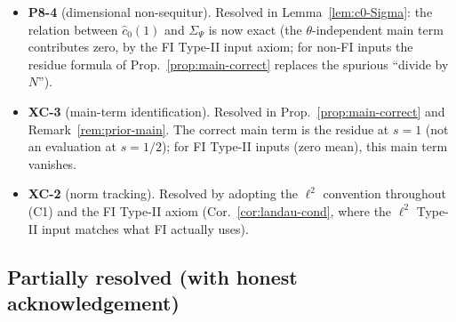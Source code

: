 \documentclass[11pt]{article}
\theoremstyle{definition}
\begin{document}
\begin{itemize}[itemsep=2pt]
\item \textbf{P8-4} (dimensional non-sequitur). Resolved in Lemma~\ref{lem:c0-Sigma}: the relation between $\widehat c_0(1)$ and $\Sigma_\Psi$ is now exact (the $\theta$-independent main term contributes zero, by the FI Type-II input axiom; for non-FI inputs the residue formula of Prop.~\ref{prop:main-correct} replaces the spurious ``divide by $N$'').
\item \textbf{XC-3} (main-term identification). Resolved in Prop.~\ref{prop:main-correct} and Remark~\ref{rem:prior-main}. The correct main term is the residue at $s=1$ (not an evaluation at $s=1/2$); for FI Type-II inputs (zero mean), this main term vanishes.
\item \textbf{XC-2} (norm tracking). Resolved by adopting the $\ell^2$ convention throughout (C1) and the FI Type-II axiom (Cor.~\ref{cor:landau-cond}, where the $\ell^2$ Type-II input matches what FI actually uses).
\end{itemize}

\subsection{Partially resolved (with honest acknowledgement)}
\end{document}
